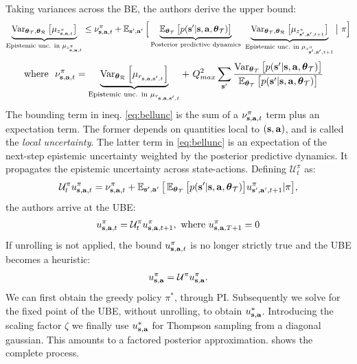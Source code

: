\documentclass{article}
\begin{document}
\begin{appendices}
Taking variances across the BE, the authors derive the upper bound:
\begin{align} \label{eq:bellunc}
\underbrace{\operatorname{\text{Var}}_{\boldsymbol{\theta}_{\mathcal{T}}, \boldsymbol{\theta}_{\mathcal{R}}} \big[ \mu_{z^\pi_{\mathbf{s}, \mathbf{a}, t}} \big]}_{\text{Epistemic unc. in $\mu_{z^\pi_{\mathbf{s}, \mathbf{a}, t}}$}} \leq \nu^{\pi}_{\mathbf{s}, \mathbf{a}, t} + \operatorname{\mathbb{E}}_{\mathbf{s}', \mathbf{a}'} \Big[ \underbrace{\operatorname{\mathbb{E}}_{\boldsymbol{\theta}_{\mathcal{T}}} \big[p(\mathbf{s}' | \mathbf{s}, \mathbf{a}, \boldsymbol{\theta}_{\mathcal{T}}) \big] }_{\text{Posterior predictive dynamics}}~\underbrace{\operatorname{\text{Var}}_{\boldsymbol{\theta}_{\mathcal{T}}, \boldsymbol{\theta}_{\mathcal{R}}} \big[ \mu_{z^\pi_{\mathbf{s}', \mathbf{a}', t + 1}} \big]}_{\text{Epistemic unc. in $\mu_{z^\pi_{\mathbf{s}', \mathbf{a}', t + 1}}$}} \big|~\pi \Big]
\end{align}
\begin{align} \label{eq:localunc}
\text{where}~~ \nu^{\pi}_{\mathbf{s}, \mathbf{a}, t} &=  \underbrace{\operatorname{\text{Var}}_{\boldsymbol{\theta}_{\mathcal{R}}} \left[ \mu_{r_{\mathbf{s}, \mathbf{a}, \mathbf{s}', t}} \right]}_{\text{Epistemic unc. in $\mu_{r_{\mathbf{s}, \mathbf{a}, \mathbf{s}', t}}$}} +~Q_{max}^2 \sum_{\mathbf{s}'} \frac{\operatorname{\text{Var}}_{\boldsymbol{\theta}_{\mathcal{T}}} \big[p(\mathbf{s}' | \mathbf{s}, \mathbf{a}, \boldsymbol{\theta}_{\mathcal{T}}) \big]}{\operatorname{\mathbb{E}}_{\boldsymbol{\theta}_{\mathcal{T}}} \big[p(\mathbf{s}' | \mathbf{s}, \mathbf{a}, \boldsymbol{\theta}_{\mathcal{T}}) \big]}
\end{align}
The bounding term in ineq. \ref{eq:bellunc} is the sum of a $\nu^{\pi}_{\mathbf{s}, \mathbf{a}, t}$ term plus an expectation term. The former depends on quantities local to $(\mathbf{s}, \mathbf{a})$, and is called the \textit{local uncertainty}. The latter term in \cref{eq:bellunc} is an expectation of the next-step epistemic uncertainty weighted by the posterior predictive dynamics. It propagates the epistemic uncertainty across state-actions. Defining $\mathcal{U}^\pi_{t}$ as:
\begin{align*}
\mathcal{U}^\pi_t u_{\mathbf{s}, \mathbf{a}, t}^\pi  = \nu^{\pi}_{\mathbf{s}, \mathbf{a}, t} + \operatorname{\mathbb{E}}_{\mathbf{s}', \mathbf{a}'} \big[ \operatorname{\mathbb{E}}_{\boldsymbol{\theta}_{\mathcal{T}}} \big[p(\mathbf{s}' | \mathbf{s}, \mathbf{a}, \boldsymbol{\theta}_{\mathcal{T}})\big] u^\pi_{\mathbf{s}', \mathbf{a}', t + 1} | \pi \big],
\end{align*}
the authors arrive at the UBE:
\begin{gather*}
u_{\mathbf{s}, \mathbf{a}, t}^\pi = \mathcal{U}^\pi_{t} u_{\mathbf{s}, \mathbf{a}, t + 1}^\pi,\text{ where } u_{\mathbf{s}, \mathbf{a}, T + 1}^\pi = 0
\end{gather*}
If unrolling is not applied, the bound $u_{\mathbf{s}, \mathbf{a}, t}^\pi$ is no longer strictly true and the UBE becomes a heuristic:
\begin{align}\label{app:eq:ubenounroll}
u_{\mathbf{s}, \mathbf{a}}^\pi = \mathcal{U}^\pi u_{\mathbf{s}, \mathbf{a}}^\pi.
\end{align}
We can first obtain the greedy policy ${\pi^*}$, through PI. Subsequently we solve for the fixed point of the UBE, without unrolling, to obtain $u_{\mathbf{s}, \mathbf{a}}^*$. Introducing the scaling factor $\zeta$ we finally use $u_{\mathbf{s}, \mathbf{a}}^*$ for Thompson sampling from a diagonal gaussian. This amounts to a factored posterior approximation.  shows the complete process.


\end{appendices}
\end{document}
